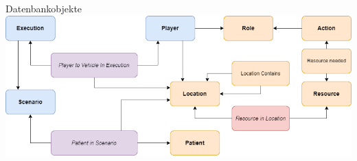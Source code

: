 \begin{frame}{Datenbankobjekte}
	\centering
	\includegraphics[width=\textwidth]{images/server_datenbank_objekte.png}
\end{frame}
